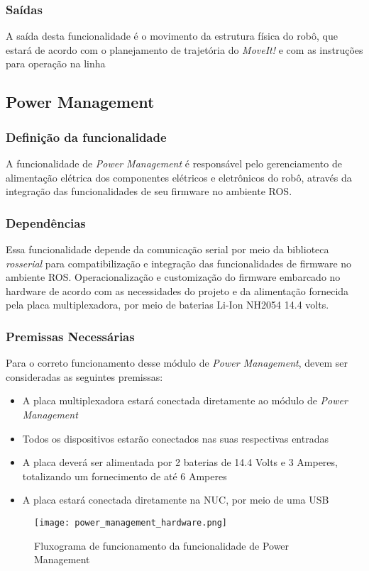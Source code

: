\subsubsection{Saídas}
A saída desta funcionalidade é o movimento da estrutura física do robô, que estará de acordo com o planejamento de trajetória do \textit{MoveIt!} e com as instruções para operação na linha

\subsection{Power Management}
\label{ssec:power}
\subsubsection{Definição da funcionalidade}

A funcionalidade de \textit{Power Management} é responsável pelo gerenciamento de alimentação elétrica dos componentes elétricos e eletrônicos do robô, através da integração das funcionalidades de seu firmware no ambiente ROS.
\subsubsection{Dependências}
Essa funcionalidade depende da comunicação serial por meio da biblioteca \textit{rosserial} para compatibilização e integração das funcionalidades de firmware no ambiente ROS. Operacionalização e customização do firmware embarcado no hardware de acordo com as necessidades do projeto e da alimentação fornecida pela placa multiplexadora, por meio de baterias Li-Ion NH2054 14.4 volts.

\subsubsection{Premissas Necessárias}
Para o correto funcionamento desse módulo de \textit{Power Management}, devem ser consideradas as seguintes premissas:
\begin{itemize}
	\item A placa multiplexadora estará conectada diretamente ao módulo de \textit{Power Management} 
	\item Todos os dispositivos estarão conectados nas suas respectivas entradas
	\item A placa deverá ser alimentada por 2 baterias de 14.4 Volts e 3 Amperes, totalizando um fornecimento de até 6 Amperes
	\item A placa estará conectada diretamente na NUC, por meio de uma USB	
	
\end{itemize}
\begin{figure}[h]
	\centering
	\texttt{[image: power\_management\_hardware.png]}
	\caption{Fluxograma de funcionamento da funcionalidade de Power Management}
	\label{fig:power_management_hardware}
\end{figure}
